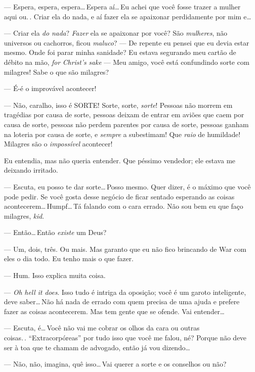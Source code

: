 --- Espera, espera, espera\ldots\,Espera aí\ldots\,Eu achei que você fosse trazer a mulher aqui ou.\,.\,\,Criar ela do nada, e aí fazer ela se apaixonar perdidamente por mim e\ldots

--- Criar ela \emph{do nada}? \emph{Fazer} ela se apaixonar por você? São \emph{mulheres}, não universos ou cachorros, ficou \emph{maluco}?  --- De repente eu pensei que eu devia estar mesmo. Onde foi parar minha sanidade? Eu estava segurando meu cartão de débito na mão, \foreignlanguage{english}{\emph{for Christ's sake}} --- Meu amigo, você está confundindo sorte com milagres! Sabe o que são milagres?

--- É-é o improvável acontecer!

--- Não, caralho, isso é SORTE! Sorte, sorte, \emph{sorte}! Pessoas não morrem em tragédias por causa de sorte, pessoas deixam de entrar em aviões que caem por causa de sorte, pessoas não perdem parentes por causa de sorte, pessoas ganham na loteria por causa de sorte, e \emph{sempre} a subestimam! Que \emph{raio} de humildade! Milagres são o \emph{impossível} acontecer!

Eu entendia, mas não queria entender. Que péssimo vendedor; ele estava me deixando irritado.

--- Escuta, eu posso te dar sorte\ldots\,Posso mesmo. Quer dizer, é o máximo que você pode pedir. Se você gosta desse negócio de ficar sentado esperando as coisas acontecerem\ldots\,Hum\-pf\ldots\,Tá falando com o cara errado. Não sou bem eu que faço milagres, \emph{kid}.

--- Então\ldots\,Então \emph{existe} um Deus?

--- Um, dois, três. Ou mais. Mas garanto que eu não fico brincando de War com eles o dia todo. Eu tenho mais o que fazer.

--- Hum. Isso explica muita coisa.

--- \emph{Oh hell it does}. Isso tudo é intriga da oposição; você é um garoto inteligente, deve saber\ldots\,Não há nada de errado com quem precisa de uma ajuda e prefere fazer as coisas acontecerem. Mas tem gente que se ofende. Vai entender\ldots

--- Escuta, é\ldots\,Você não vai me cobrar os olhos da cara ou outras coisas.\,.\,\,``Extracorpóreas'' por tudo isso que você me falou, né? Porque não deve ser à toa que te chamam de advogado, então já vou dizendo\ldots

--- Não, não, imagina, quê isso\ldots\,Vai querer a sorte e os conselhos ou não?

